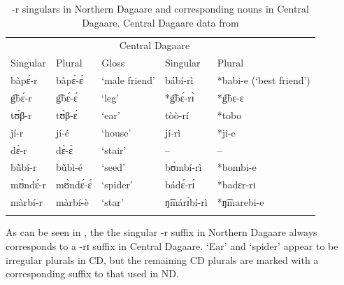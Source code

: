 \documentclass[output=paper,colorlinks,citecolor=brown,
]{langscibook}
\begin{document}
\begin{table}

  \caption{-r singulars in Northern Dagaare and corresponding nouns in Central Dagaare. Central Dagaare data from \citet{aliDictionary2021}}
  \label{tab:Caragine:rSing}
  
\begin{tabular}{lllll}
\lsptoprule 
\multicolumn{2}{c}{Northern Dagaare} & \multicolumn{1}{c}{}& \multicolumn{2}{c}{Central Dagaare}\\
Singular & Plural & Gloss 
& Singular & Plural \\
\midrule\midrule
bàpɛ́-r & bàpɛ́-ɛ́ & `male friend' &bábí-rì& *babi-e (`best friend')\\
g͡bɛ́-r & g͡bɛ́-ɛ́ & `leg' & *g͡bɛ́-rɪ̀ & *g͡bɛ-ɛ\\
tʊ́β-r & tʊ̀β-ɛ́ & `ear' & tòò-rí & *tobo \\
jí-r & jí-é & `house' & jí-rì& *ji-e\\
dɛ̀-r & dɛ̀-ɛ̀ & `stair' &--&--\\
bũ̀bí-r & bũ̀bì-é & `seed' & bʊ́mbí-rì & *bombi-e\\  
mʊ̀ndɛ́-r & mʊ̀ndɛ́-ɛ́ & `spider' & bádɛ́-rɪ́ & *badɛr-rɪ \\
màrbí-r & màrbí-è & `star' & ŋ͡márɪ́bí-rì & *ŋ͡marebi-e \\
\lspbottomrule 

\end{tabular}
\end{table}

As can be seen in , the the singular -r suffix in Northern Dagaare always corresponds to a -rɪ suffix in Central Dagaare. `Ear' and `spider' appear to be irregular plurals in CD, but the remaining CD plurals are marked with a corresponding suffix to that used in ND.

\end{document}
